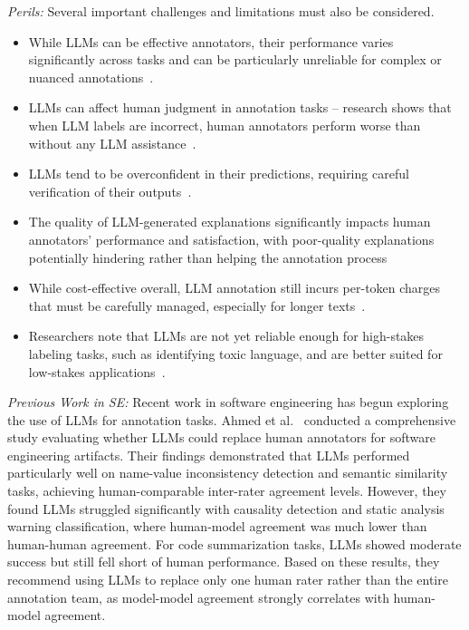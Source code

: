 \documentclass[11pt]{article}
\begin{document}
\emph{Perils:} Several important challenges and limitations must also be considered. 
\begin{itemize}
    \item While LLMs can be effective annotators, their performance varies significantly across tasks and can be particularly unreliable for complex or nuanced annotations~\cite{DBLP:conf/www/HuangKA23a,DBLP:conf/chi/Wang0RMM24}. 
    \item LLMs can affect human judgment in annotation tasks -- research shows that when LLM labels are incorrect, human annotators perform worse than without any LLM assistance~\cite{DBLP:conf/www/HuangKA23a}. 
    \item LLMs tend to be overconfident in their predictions, requiring careful verification of their outputs~\cite{DBLP:conf/kdd/WanSJKCNSSWYABJ24}. 
    \item The quality of LLM-generated explanations significantly impacts human annotators' performance and satisfaction, with poor-quality explanations potentially hindering rather than helping the annotation process~\cite{DBLP:conf/chi/Wang0RMM24}
    \item While cost-effective overall, LLM annotation still incurs per-token charges that must be carefully managed, especially for longer texts~\cite{DBLP:conf/emnlp/WangLXZZ21}. 
    \item Researchers note that LLMs are not yet reliable enough for high-stakes labeling tasks, such as identifying toxic language, and are better suited for low-stakes applications~\cite{DBLP:conf/chi/Wang0RMM24}.
\end{itemize}

\emph{Previous Work in SE:} Recent work in software engineering has begun exploring the use of LLMs for annotation tasks. 
Ahmed et al.~\cite{DBLP:journals/corr/abs-2408-05534} conducted a comprehensive study evaluating whether LLMs could replace human annotators for software engineering artifacts.
Their findings demonstrated that LLMs performed particularly well on name-value inconsistency detection and semantic similarity tasks, achieving human-comparable inter-rater agreement levels. 
However, they found LLMs struggled significantly with causality detection and static analysis warning classification, where human-model agreement was much lower than human-human agreement. 
For code summarization tasks, LLMs showed moderate success but still fell short of human performance. 
Based on these results, they recommend using LLMs to replace only one human rater rather than the entire annotation team, as model-model agreement strongly correlates with human-model agreement.
\end{document}

